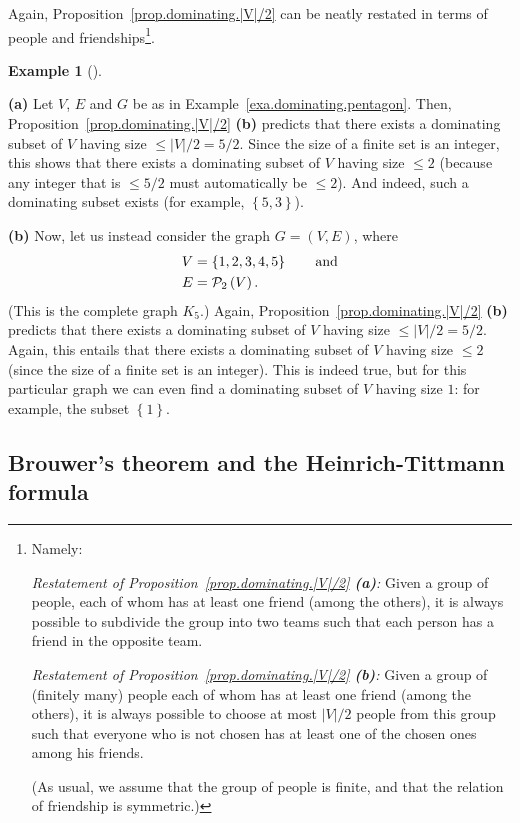 \documentclass[numbers=enddot,12pt,final,onecolumn,notitlepage]{scrartcl}%
\theoremstyle{definition}
\newtheorem{exam}[theo]{Example}
\newenvironment{example}[1][]
{\begin{exam}[#1]\begin{leftbar}}
{\end{leftbar}\end{exam}}
\newcommand{\powset}[2][]{\ifthenelse{\equal{#2}{}}{\mathcal{P}\left(#1\right)}{\mathcal{P}_{#1}\left(#2\right)}}
\newcommand{\set}[1]{\left\{ #1 \right\}}
\newcommand{\abs}[1]{\left| #1 \right|}
\newcommand{\tup}[1]{\left( #1 \right)}
\begin{document}
Again, Proposition~\ref{prop.dominating.|V|/2} can be neatly restated
in terms of people and friendships\footnote{Namely:

\textit{Restatement of
Proposition~\ref{prop.dominating.|V|/2} \textbf{(a)}:} Given a group
of people, each of whom has at least one friend (among the others),
it is always possible to subdivide the group into two teams such that
each person has a friend in the opposite team.

\textit{Restatement of
Proposition~\ref{prop.dominating.|V|/2} \textbf{(b)}:} Given a group
of (finitely many) people each of whom has at least one friend (among
the others),
it is always possible to choose at most $\abs{V}/{2}$ people from this
group such that everyone who is not chosen has at least one of the
chosen ones among his friends.

(As usual, we assume that the group of people is finite, and that the
relation of friendship is symmetric.)}.

\begin{example}
\textbf{(a)} Let $V$, $E$ and $G$ be as in
Example~\ref{exa.dominating.pentagon}.
Then, Proposition~\ref{prop.dominating.|V|/2} \textbf{(b)} predicts
that there exists a dominating subset of $V$ having size
$\leq \abs{V}/2 = 5/2$. Since the size of a finite set is an integer,
this shows that there exists a dominating subset of $V$ having size
$\leq 2$ (because any integer that is $\leq 5/2$ must automatically be
$\leq 2$). And indeed, such a dominating subset exists
(for example, $\set{5, 3}$).

\textbf{(b)} Now, let us instead consider the graph $G = \tup{V, E}$,
where
\begin{align*}
V &= \set{1, 2, 3, 4, 5} \qquad \text{and} \\
E &= \powset[2]{V} .
\end{align*}
(This is the complete graph $K_5$.)
Again, Proposition~\ref{prop.dominating.|V|/2} \textbf{(b)} predicts
that there exists a dominating subset of $V$ having size
$\leq \abs{V}/2 = 5/2$. Again, this entails that
there exists a dominating subset of $V$ having size $\leq 2$ (since
the size of a finite set is an integer). This is indeed true, but for
this particular graph we can even find a dominating subset of $V$
having size $1$: for example, the subset $\set{1}$.
\end{example}

\subsection{\label{subsect.dominating.odd}Brouwer's theorem and the
Heinrich-Tittmann formula}
\end{document}
